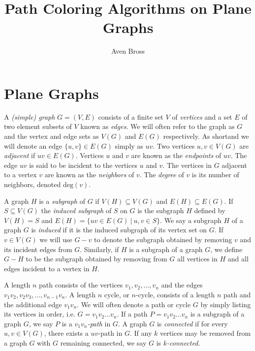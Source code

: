 \documentclass[letterpaper, 12pt]{amsart}
\title{Path Coloring Algorithms on Plane Graphs}
\author{Aven Bross}
\theoremstyle{definition}
\theoremstyle{definition}
\theoremstyle{thm}
\theoremstyle{definition}
\begin{document}
\maketitle

\section{Plane Graphs}

A \textit{(simple) graph} $G=(V,E)$ consists of a finite set $V$ of
\textit{vertices} and a set $E$ of two element subsets of $V$ known as
\textit{edges}. We will often refer to the graph as $G$ and the vertex and
edge sets as $V(G)$ and $E(G)$ respectively. As shortand we will denote an edge
$\{u,v\}\in E(G)$ simply as $uv$. Two vertices $u,v\in V(G)$ are
\textit{adjacent} if $uv\in E(G)$. Vertices $u$ and $v$ are known as the
\textit{endpoints} of $uv$. The edge $uv$ is said to be incident to the vertices
$u$ and $v$. The vertices in $G$ adjacent to a vertex $v$ are known as
the \textit{neighbors} of $v$. The \textit{degree} of $v$ is its number of
neighbors, denoted $\text{deg}(v)$.

A graph $H$ is a \textit{subgraph} of $G$ if $V(H)\subseteq V(G)$ and
$E(H)\subseteq E(G)$. If $S\subseteq V(G)$ the \textit{induced subgraph} of
$S$ on $G$ is the subgraph $H$ defined by $V(H)=S$ and
$E(H)=\{uv\in E(G) \ | \ u,v\in S\}$. We say a subgraph $H$ of a graph $G$ is
\textit{induced} if it is the induced subgraph of its vertex set on $G$. If
$v\in V(G)$ we will use $G-v$ to denote the subgraph obtained by removing $v$
and its incident edges from $G$. Similarly, if $H$ is a subgraph of a graph $G$,
we define $G-H$ to be the subgraph obtained by removing from $G$ all vertices in
$H$ and all edges incident to a vertex in $H$.

A length $n$ path consists of the vertices $v_1,v_2,\ldots,v_n$ and the edges $v_1v_2,
v_2v_3,\ldots,v_{n-1}v_n$. A length $n$ cycle, or $n$-cycle, consists of a
length $n$ path and the additional edge $v_1v_n$. We will often denote a path
or cycle $G$ by simply listing its vertices in order, i.e. $G=v_1v_2\ldots v_n$.
If a path $P=v_1v_2\ldots v_n$ is a subgraph of a graph $G$, we say $P$ is a
\textit{$v_1v_n$-path} in $G$. A graph $G$ is \textit{connected} if for every
$u,v\in V(G)$, there exists a $uv$-path in $G$. If any $k$ vertices may be
removed from a graph $G$ with $G$ remaining connected, we say $G$ is
\textit{$k$-connected}.
\end{document}
